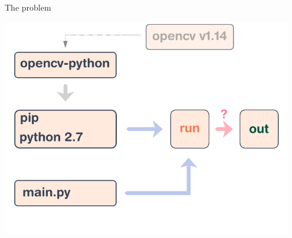 \documentclass[t, aspectratio=169]{beamer}
\begin{document}
\begin{frame}{The problem}
    \begin{center}
        \includegraphics[width=0.95\textwidth]{img/schema-build.pdf}
    \end{center}
\end{frame}
\end{document}
